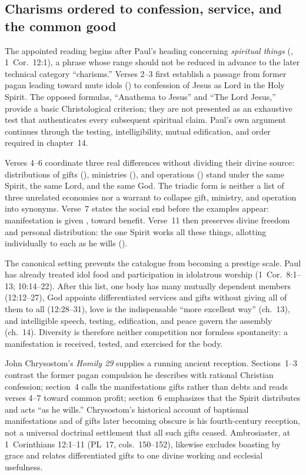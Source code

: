 \sectionguard
\subsection*{Charisms ordered to confession, service, and the common good\enspace{}}

The appointed reading begins after Paul's heading concerning
\emph{spiritual things} (, 1~Cor.~12:1), a phrase
whose range should not be reduced in advance to the later technical category
``charisms.'' Verses 2--3 first establish a passage from former pagan leading
toward mute idols () to confession of Jesus as Lord in
the Holy Spirit. The opposed formulas, ``Anathema to Jesus'' and ``The Lord
Jesus,'' provide a basic Christological criterion; they are not presented as
an exhaustive test that authenticates every subsequent spiritual claim.
Paul's own argument continues through the testing, intelligibility, mutual
edification, and order required in chapter~14.

Verses 4--6 coordinate three real differences without dividing their divine
source: distributions of gifts (),
ministries (), and operations
() stand under the same Spirit, the same Lord, and the
same God. The triadic form is neither a list of three unrelated economies nor
a warrant to collapse gift, ministry, and operation into synonyms. Verse~7
states the social end before the examples appear: manifestation is given
, toward benefit. Verse~11 then preserves divine
freedom and personal distribution: the one Spirit works all these things,
allotting individually to each as he wills
().

The canonical setting prevents the catalogue from becoming a prestige scale.
Paul has already treated idol food and participation in idolatrous worship
(1~Cor.~8:1--13; 10:14--22). After this list, one body has many mutually
dependent members (12:12--27), God appoints differentiated services and gifts
without giving all of them to all (12:28--31), love is the indispensable
``more excellent way'' (ch.~13), and intelligible speech, testing, edification,
and peace govern the assembly (ch.~14). Diversity is therefore neither
competition nor formless spontaneity: a manifestation is received, tested,
and exercised for the body.

John Chrysostom's \emph{Homily 29} supplies a running ancient reception.
Sections~1--3 contrast the former pagan compulsion he describes with rational
Christian confession; section~4 calls the manifestations gifts rather than
debts and reads verses 4--7 toward common profit; section~6 emphasizes that
the Spirit distributes and acts ``as he wills.'' Chrysostom's historical
account of baptismal manifestations and of gifts later becoming obscure is
his fourth-century reception, not a universal doctrinal settlement that all
such gifts ceased. Ambrosiaster, at 1~Corinthians 12:1--11 (PL~17,
cols.~150--152), likewise excludes boasting by grace and relates differentiated
gifts to one divine working and ecclesial usefulness.

